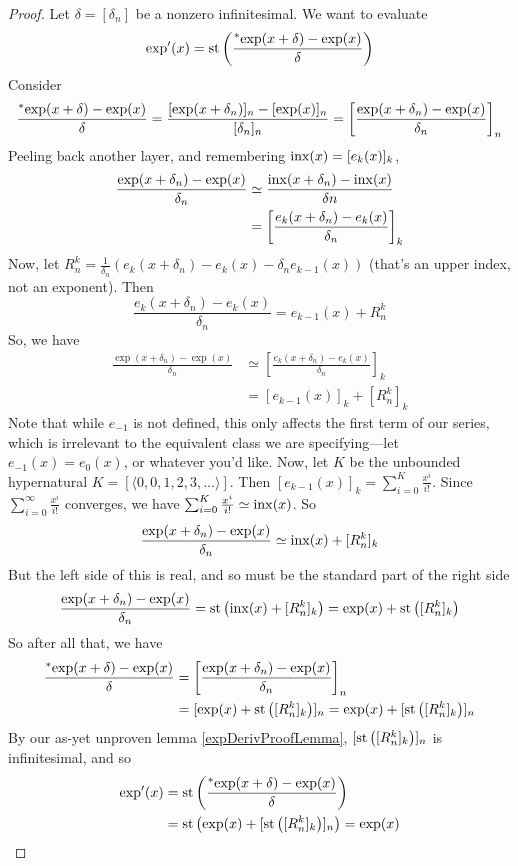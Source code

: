 \begin{proof}
    Let $\delta = [\delta_n]$ be a nonzero infinitesimal. We want to evaluate
    \[ \exp'(x) = \operatorname{st}\left(\frac{\prescript{*}{}{\exp}(x + \delta) - \exp(x)}{\delta}\right) \]
    Consider
    \[ \frac{\prescript{*}{}{\exp}(x + \delta) - \exp(x)}{\delta} = \frac{[\exp(x+\delta_n)]_n - [\exp(x)]_n}{[\delta_n]_n} = \left[ \frac{\exp(x + \delta_n) - \exp(x)}{\delta_n} \right]_n \]
    Peeling back another layer, and remembering $\operatorname{inx}(x) = [e_k(x)]_k$,
    \begin{align*}
    \frac{\exp(x + \delta_n) - \exp(x)}{\delta_n} &\simeq \frac{\operatorname{inx}(x + \delta_n) - \operatorname{inx}(x)}{\delta n} \\
    &= \left[ \frac{e_k(x + \delta_n) - e_k(x)}{\delta_n} \right]_k
    \end{align*}
    Now, let $R_n^k = \frac{1}{\delta_n}(e_k(x + \delta_n) - e_k(x) - \delta_n e_{k-1}(x))$ (that's an upper index, not an exponent). Then 
    \[ \frac{e_k(x+\delta_n) - e_k(x)}{\delta_n} = e_{k-1}(x) + R_n^k \]
    So, we have 
    \begin{align*}
    \frac{\exp(x + \delta_n) - \exp(x)}{\delta_n} &\simeq \left[ \frac{e_k(x + \delta_n) - e_k(x)}{\delta_n} \right]_k \\
    &= [e_{k-1}(x)]_k + [R_n^k]_k
    \end{align*}
    Note that while $e_{-1}$ is not defined, this only affects the first term of our series, which is irrelevant to the equivalent class we are specifying---let $e_{-1}(x) = e_0(x)$, or whatever you'd like. Now, let $K$ be the unbounded hypernatural $K = [\langle 0, 0, 1, 2, 3, \ldots \rangle]$. Then $[e_{k-1}(x)]_k = \sum_{i=0}^K \frac{x^i}{i!}$. Since $\sum_{i=0}^\infty \frac{x^i}{i!}$ converges, we have $\sum_{i=0}^K \frac{x^i}{i!} \simeq \operatorname{inx}(x)$. So
    \[ \frac{\exp(x + \delta_n) - \exp(x)}{\delta_n} \simeq \operatorname{inx}(x) + [R_n^k]_k \]
    But the left side of this is real, and so must be the standard part of the right side
    \[ \frac{\exp(x + \delta_n) - \exp(x)}{\delta_n} = \operatorname{st}\left(\operatorname{inx}(x) + [R_n^k]_k\right) = \exp(x) + \operatorname{st}\left([R_n^k]_k\right) \]
    So after all that, we have 
    \begin{align*}
    \frac{\prescript{*}{}{\exp}(x + \delta) - \exp(x)}{\delta} &= \left[ \frac{\exp(x + \delta_n) - \exp(x)}{\delta_n} \right]_n \\
        &= [\exp(x) + \operatorname{st}\left([R_n^k]_k\right)]_n = \exp(x) + [\operatorname{st}\left([R_n^k]_k\right)]_n
    \end{align*}
    By our as-yet unproven lemma \ref{expDerivProofLemma}, $[\operatorname{st}\left([R_n^k]_k\right)]_n$ is infinitesimal, and so
    \begin{align*}
    \exp'(x) &= \operatorname{st}\left(\frac{\prescript{*}{}{\exp}(x + \delta) - \exp(x)}{\delta}\right) \\
    &= \operatorname{st}\left(\exp(x) + [\operatorname{st}\left([R_n^k]_k\right)]_n\right) = \exp(x)
    \end{align*}
\end{proof}

